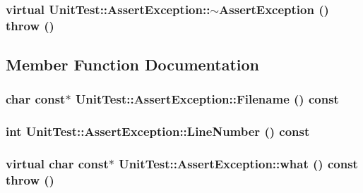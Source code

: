 \hypertarget{class_unit_test_1_1_assert_exception_6e4d995dd718aa09b7e405cd7a0dbc7b}{
\subsubsection[{$\sim$AssertException}]{\setlength{\rightskip}{0pt plus 5cm}virtual UnitTest::AssertException::$\sim$AssertException ()  throw ()}}
\label{class_unit_test_1_1_assert_exception_6e4d995dd718aa09b7e405cd7a0dbc7b}




\subsection{Member Function Documentation}
\hypertarget{class_unit_test_1_1_assert_exception_48f1f3e218b14a584fef01ba0bf783af}{
\subsubsection[{Filename}]{\setlength{\rightskip}{0pt plus 5cm}char const$\ast$ UnitTest::AssertException::Filename () const}}
\label{class_unit_test_1_1_assert_exception_48f1f3e218b14a584fef01ba0bf783af}


\hypertarget{class_unit_test_1_1_assert_exception_f94e4817bb3ee0af0f53520738a08545}{
\subsubsection[{LineNumber}]{\setlength{\rightskip}{0pt plus 5cm}int UnitTest::AssertException::LineNumber () const}}
\label{class_unit_test_1_1_assert_exception_f94e4817bb3ee0af0f53520738a08545}


\hypertarget{class_unit_test_1_1_assert_exception_f7b481e06592e0c186629048fccc1ce9}{
\subsubsection[{what}]{\setlength{\rightskip}{0pt plus 5cm}virtual char const$\ast$ UnitTest::AssertException::what () const  throw ()}}
\label{class_unit_test_1_1_assert_exception_f7b481e06592e0c186629048fccc1ce9}




